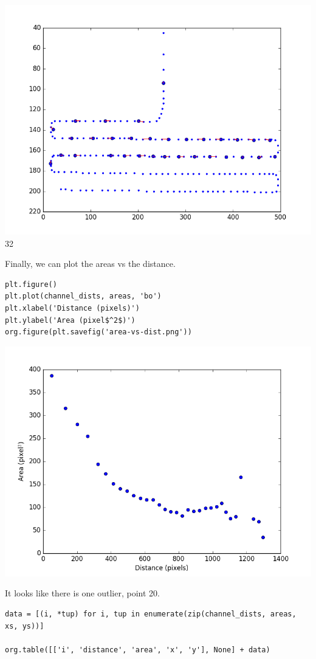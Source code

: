 \documentclass[11pt]{article}
\begin{document}
\includegraphics[width=.9\linewidth]{closest-dots.png}
32

Finally, we can plot the areas vs the distance.

\begin{verbatim}
plt.figure()
plt.plot(channel_dists, areas, 'bo')
plt.xlabel('Distance (pixels)')
plt.ylabel('Area (pixel$^2$)')
org.figure(plt.savefig('area-vs-dist.png'))
\end{verbatim}

\includegraphics[width=.9\linewidth]{area-vs-dist.png}

It looks like there is one outlier, point 20.

\begin{verbatim}
data = [(i, *tup) for i, tup in enumerate(zip(channel_dists, areas, xs, ys))]

org.table([['i', 'distance', 'area', 'x', 'y'], None] + data)
\end{verbatim}
\end{document}
